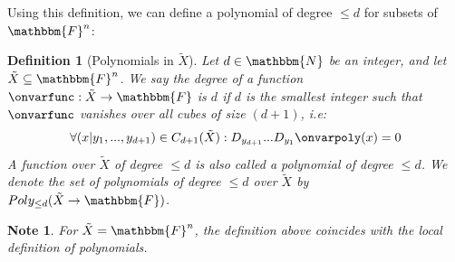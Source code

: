 \documentclass[10pt,a4paper]{article}
\newtheorem{definition}[theorem]{Definition}
\newtheorem*{note*}{Note}
\newcommand{\basefield}[0]{\mathbbm{F}}
\newcommand{\blocklength}[0]{n}
\newcommand{\field}[0]{\basefield^{\blocklength}}
\newcommand{\degree}[0]{d}
\newcommand{\funcdef}[3]{#1:#2\rightarrow#3}
\newcommand{\allpolyset}[3]{Poly_{#1}(#2\rightarrow#3)}
\newcommand{\cube}[2]{(#1|#2)}
\newcommand{\cubes}[2]{C_{#1}(#2)}
\newcommand{\naturalnumbersset}[0]{\mathbbm{N}}
\newcommand{\variety}{{\tilde{X}}}
\newcommand{\directionderivative}[0]{D}
\begin{document}
Using this definition, we can define a polynomial of degree $\leq \degree$ for subsets of $\field$:
\begin{definition}[Polynomials in $\variety$]
    Let $\degree \in \naturalnumbersset$ be an integer, and let $\variety \subseteq \field$.
    We say the degree of a function $\funcdef{\onvarfunc}{\variety}{\basefield}$ is $\degree$
    if $\degree$ is the smallest integer such that $\onvarfunc$ vanishes over all cubes of size $(\degree+1)$, i.e:
    \[
        \forall {\cube{x}{y_1,...,y_{\degree + 1}} \in \cubes{\degree+1}{\variety}}:
            \directionderivative_{y_{\degree + 1}}...\directionderivative_{y_1} \onvarpoly(x) = 0
    \]
    A function over $\variety$ of degree $\leq \degree$ is also called a \emph{polynomial of degree $\leq \degree$}.
    We denote the set of polynomials of degree $\leq \degree$ over $\variety$ by $\allpolyset{\leq \degree}{\variety}{\basefield}$.
\end{definition}
\begin{note*}
    For $\variety = \field$, the definition above coincides with the local definition of polynomials.
\end{note*}
\end{document}
